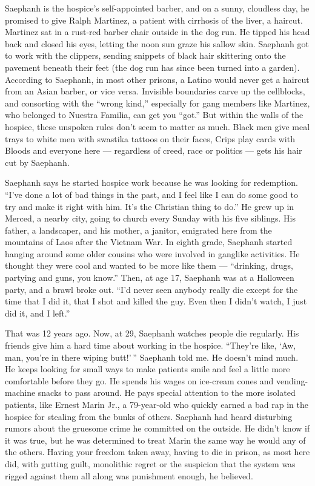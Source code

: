 Saephanh is the hospice's self-appointed barber, and on a sunny,
cloudless day, he promised to give Ralph Martinez, a patient with
cirrhosis of the liver, a haircut. Martinez sat in a rust-red barber
chair outside in the dog run. He tipped his head back and closed his
eyes, letting the noon sun graze his sallow skin. Saephanh got to work
with the clippers, sending snippets of black hair skittering onto the
pavement beneath their feet (the dog run has since been turned into a
garden). According to Saephanh, in most other prisons, a Latino would
never get a haircut from an Asian barber, or vice versa. Invisible
boundaries carve up the cellblocks, and consorting with the ``wrong
kind,'' especially for gang members like Martinez, who belonged to
Nuestra Familia, can get you ``got.'' But within the walls of the
hospice, these unspoken rules don't seem to matter as much. Black men
give meal trays to white men with swastika tattoos on their faces, Crips
play cards with Bloods and everyone here --- regardless of creed, race
or politics --- gets his hair cut by Saephanh.

Saephanh says he started hospice work because he was looking for
redemption. ``I've done a lot of bad things in the past, and I feel like
I can do some good to try and make it right with him. It's the Christian
thing to do.'' He grew up in Merced, a nearby city, going to church
every Sunday with his five siblings. His father, a landscaper, and his
mother, a janitor, emigrated here from the mountains of Laos after the
Vietnam War. In eighth grade, Saephanh started hanging around some older
cousins who were involved in ganglike activities. He thought they were
cool and wanted to be more like them --- ``drinking, drugs, partying and
guns, you know.'' Then, at age 17, Saephanh was at a Halloween party,
and a brawl broke out. ``I'd never seen anybody really die except for
the time that I did it, that I shot and killed the guy. Even then I
didn't watch, I just did it, and I left.''

That was 12 years ago. Now, at 29, Saephanh watches people die
regularly. His friends give him a hard time about working in the
hospice. ``They're like, `Aw, man, you're in there wiping butt!' ''
Saephanh told me. He doesn't mind much. He keeps looking for small ways
to make patients smile and feel a little more comfortable before they
go. He spends his wages on ice-cream cones and vending-machine snacks to
pass around. He pays special attention to the more isolated patients,
like Ernest Marin Jr., a 79-year-old who quickly earned a bad rap in the
hospice for stealing from the bunks of others. Saephanh had heard
disturbing rumors about the gruesome crime he committed on the outside.
He didn't know if it was true, but he was determined to treat Marin the
same way he would any of the others. Having your freedom taken away,
having to die in prison, as most here did, with gutting guilt,
monolithic regret or the suspicion that the system was rigged against
them all along was punishment enough, he believed.

